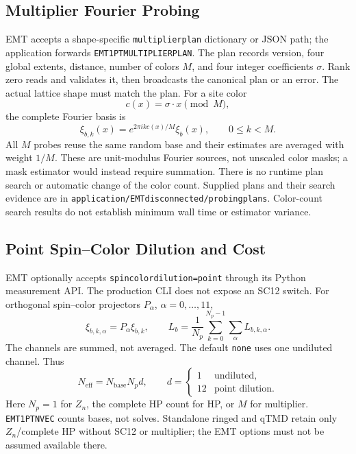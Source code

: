 \documentclass[11pt,a4paper]{article}
\newcommand{\code}[1]{\texttt{\begingroup\def\_{\textunderscore\allowbreak}#1\endgroup}}
\begin{document}
\subsection{Multiplier Fourier Probing}

EMT accepts a shape-specific \code{multiplier\_plan} dictionary or JSON path;
the application forwards \code{EMT\_1PT\_MULTIPLIER\_PLAN}. The plan records
version, four global extents, distance, number of colors \(M\), and four integer
coefficients \(\sigma\). Rank zero reads and validates it, then broadcasts the
canonical plan or an error. The actual lattice shape must match the plan.
For a site color
\begin{equation}
  c(x)=\sigma\cdot x\pmod M,
\end{equation}
the complete Fourier basis is
\begin{equation}
  \xi_{b,k}(x)=e^{2\pi i k c(x)/M}\xi_b(x),\qquad 0\leq k<M.
\end{equation}
All \(M\) probes reuse the same random base and their estimates are averaged
with weight \(1/M\). These are unit-modulus Fourier sources, not unscaled
color masks; a mask estimator would instead require summation.
There is no runtime plan search or automatic change of the color count.
Supplied plans and their search evidence are in
\code{application/EMT\_disconnected\_1pt/probing\_plans}. Color-count search
results do not establish minimum wall time or estimator variance.

\subsection{Point Spin--Color Dilution and Cost}

EMT optionally accepts \code{spin\_color\_dilution=point} through its Python
measurement API. The production CLI does not expose an SC12 switch.
For orthogonal spin--color projectors \(P_\alpha\), \(\alpha=0,\ldots,11\),
\begin{equation}
  \xi_{b,k,\alpha}=P_\alpha\xi_{b,k},\qquad
  L_b=\frac{1}{N_p}\sum_{k=0}^{N_p-1}\sum_\alpha L_{b,k,\alpha}.
\end{equation}
The channels are summed, not averaged. The default \code{none} uses one
undiluted channel. Thus
\begin{equation}
  N_{\mathrm{eff}}=N_{\mathrm{base}}N_p d,\qquad
  d=\begin{cases}1&\text{undiluted},\\12&\text{point dilution}.\end{cases}
  \label{eq:n_eff}
\end{equation}
Here \(N_p=1\) for \(Z_n\), the complete HP count for HP, or \(M\) for
multiplier. \code{EMT\_1PT\_N\_VEC} counts bases, not solves.
Standalone ringed and qTMD retain only \(Z_n\)/complete HP without SC12 or
multiplier; the EMT options must not be assumed available there.
\end{document}
